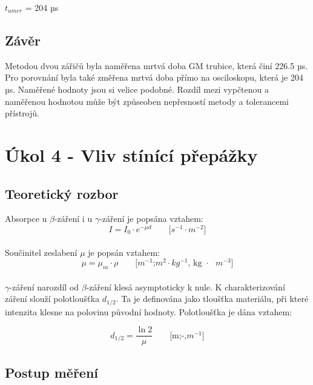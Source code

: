 \documentclass{protokol}
\begin{document}

    $t_{umer}$ = 204 µs
    


    \subsection{Závěr}

    Metodou dvou zářičů byla naměřena mrtvá doba GM trubice, která činí 226.5 µs. Pro porovnání byla také změřena mrtvá doba přímo na osciloskopu, která je 204 µs. Naměřené hodnoty jsou si velice podobné. Rozdíl mezi vypčtenou a naměřenou hodnotou může být způseoben nepřesností metody a tolerancemi přístrojů.

\pagebreak

\section{Úkol 4 - Vliv stínící přepážky}
    \subsection{Teoretický rozbor}

    Absorpce u $\beta$-záření i u $\gamma$-záření je popsána vztahem:
    \begin{equation}   
        I = I_0 \cdot e^{-\mu d}      \quad \quad    \text{[$s^{-1}$$\cdot$$m^{-2}$]}
    \end{equation}
    \\
    Součinitel zeslabení $\mu$ je popsán vztahem:
    \begin{equation}   
        \mu =  \mu_m \cdot \rho      \quad \quad    \text{[$m^{-1}$;$m^2$$\cdot$$kg^{-1}$, kg $\cdot$ $m^{-3}$]}
    \end{equation}
    \\
    $\gamma$-záření narozdíl od $\beta$-záření klesá asymptoticky k nule. K charakterizování záření slouží polotloušťka $d_{1/2}$. Ta je definována jako tloušťka materiálu, při které intenzita klesne na polovinu původní hodnoty. Polotloušťka je dána vztahem:

    \begin{equation}   
        d_{1/2} =  \dfrac{\ln{2}}{\mu}      \quad \quad    \text{[m;-,$m^{-1}$]}
    \end{equation}

    \subsection{Postup měření}
\end{document}
